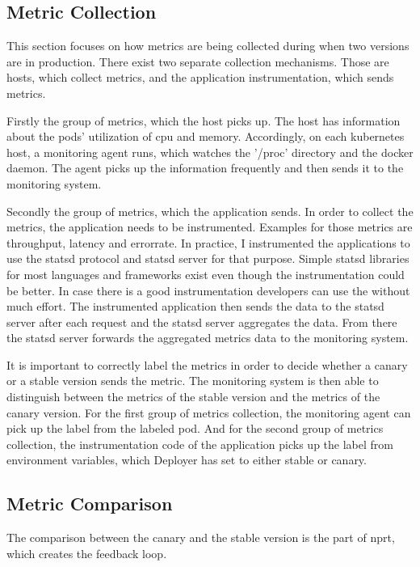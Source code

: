 \subsection{Metric Collection}

This section focuses on how metrics are being collected during when two versions are in
production. There exist two separate collection mechanisms. Those are hosts, which collect
metrics, and the application instrumentation, which sends metrics.

Firstly the group of metrics, which the host picks up. The host has information about the
pods' utilization of cpu and memory. Accordingly, on each kubernetes host, a monitoring
agent runs, which watches the '/proc' directory and the docker daemon. The agent picks up
the information frequently and then sends it to the monitoring system.

Secondly the group of metrics, which the application sends. In order to collect the
metrics, the application needs to be instrumented. Examples for those metrics are
throughput, latency and errorrate. In practice, I instrumented the applications to use the
statsd protocol and statsd server for that purpose. Simple statsd libraries for most
languages and frameworks exist even though the instrumentation could be better. In case
there is a good instrumentation developers can use the without much effort. The
instrumented application then sends the data to the statsd server after each request and
the statsd server aggregates the data. From there the statsd server forwards the
aggregated metrics data to the monitoring system.

It is important to correctly label the metrics in order to decide whether a canary or a
stable version sends the metric. The monitoring system is then able to distinguish between
the metrics of the stable version and the metrics of the canary version. For the first
group of metrics collection, the monitoring agent can pick up the label from the labeled
pod. And for the second group of metrics collection, the instrumentation code of the
application picks up the label from environment variables, which Deployer has set to
either stable or canary.

\subsection{Metric Comparison}
\label{sec:metric_comparison}

The comparison between the canary and the stable version is the part of \gls{nprt}, which
creates the feedback loop.

